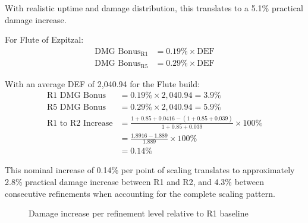 \documentclass[12pt,a4paper]{article}
\begin{document}
With realistic uptime and damage distribution, this translates to a 5.1\% practical damage increase.

For Flute of Ezpitzal:
\begin{align}
\text{DMG Bonus}_{\text{R1}} &= 0.19\% \times \text{DEF} \\
\text{DMG Bonus}_{\text{R5}} &= 0.29\% \times \text{DEF}
\end{align}

With an average DEF of 2,040.94 for the Flute build:
\begin{align}
\text{R1 DMG Bonus} &= 0.19\% \times 2,040.94 = 3.9\% \\
\text{R5 DMG Bonus} &= 0.29\% \times 2,040.94 = 5.9\% \\
\text{R1 to R2 Increase} &= \frac{1 + 0.85 + 0.0416 - (1 + 0.85 + 0.039)}{1 + 0.85 + 0.039} \times 100\% \\
&= \frac{1.8916 - 1.889}{1.889} \times 100\% \\
&= 0.14\%
\end{align}

This nominal increase of 0.14\% per point of scaling translates to approximately 2.8\% practical damage increase between R1 and R2, and 4.3\% between consecutive refinements when accounting for the complete scaling pattern.

\begin{figure}[H]
\centering
{}
\caption{Damage increase per refinement level relative to R1 baseline}
\label{fig:refinement_value}
\end{figure}
\end{document}
